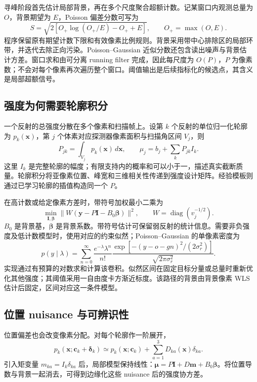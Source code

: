 \documentclass[UTF8,11pt,a4paper,fontset=fandol]{ctexart}
\newcommand{\diag}{\operatorname{diag}}
\begin{document}
寻峰阶段首先估计局部背景，再在多个尺度聚合超额计数。记某窗口内观测总量为 $O$，背景期望为 $E$，Poisson 偏差分数可写为
\begin{equation}
S=\sqrt{2\left[O_+\log(O_+/E)-O_++E\right]},
\qquad O_+=\max(O,E).
\end{equation}
程序保留原有期望计数下限和有效像素比例规则。背景采用带中心排除区的局部环带，并迭代去除正向污染。Poisson--Gaussian 近似分数还包含读出噪声与背景估计方差。窗口求和由可分离 running filter 完成，因此每尺度为 $O(P)$，$P$ 为像素数；不会对每个像素再次遍历整个窗口。阈值输出是后续指标化的候选点，其含义是局部超额信号。

\subsection{强度为何需要轮廓积分}
一个反射的总强度分散在多个像素和扫描帧上。设第 $k$ 个反射的单位归一化轮廓为 $p_k(\bm x)$，第 $j$ 个体素对应探测器像素面积与扫描角区间 $V_j$，则
\begin{equation}
P_{jk}=\int_{V_j}p_k(\bm x)\,d\bm x,\qquad
\mu_j=b_j+\sum_kP_{jk}I_k.
\end{equation}
这里 $I_k$ 是完整轮廓的幅度；有限支持内的概率和可以小于一，描述真实截断质量。轮廓积分将亚像素位置、峰宽和三维相关性传递到强度设计矩阵。经验模板则通过已学习轮廓的插值构造同一个 $P$。

在高计数或给定像素方差时，带符号加权最小二乘为
\begin{equation}
\min_{\bm I,\bm\beta}
\|W(\bm y-P\bm I-B_0\bm\beta)\|^2,
\qquad W=\diag(v_j^{-1/2}).
\end{equation}
$B_0$ 是背景基，$\bm\beta$ 是背景系数。带符号估计可保留弱反射的统计信息。需要非负强度及低计数模型时，使用对应的约束似然；Poisson--Gaussian 的单像素密度为
\begin{equation}
p(y\mid\lambda)=\sum_{n=0}^{\infty}
\frac{e^{-\lambda}\lambda^n}{n!}
\frac{\exp[-(y-o-gn)^2/(2\sigma_r^2)]}{\sqrt{2\pi\sigma_r^2}}.
\end{equation}
实现通过有预算的对数求和计算该卷积。似然区间在固定目标分量或总量时重新优化其他强度；其阈值采用一自由度卡方渐近标度。该路径的背景由背景像素 WLS 估计后固定，区间对应这一条件模型。

\subsection{位置 nuisance 与可辨识性}
位置偏差也会改变像素分配。对每个轮廓作一阶展开，
\begin{equation}
p_k(\bm x;\bm c_k+\bm\delta_k)
\simeq p_k(\bm x;\bm c_k)
+\sum_{a=1}^3D_{ka}(\bm x)\delta_{ka}.
\end{equation}
引入矩变量 $m_{ka}=I_k\delta_{ka}$ 后，局部模型保持线性：$\bm\mu=P\bm I+D\bm m+B_0\bm\beta$。将位置导数与背景一起消去，可得到边缘化这些 nuisance 后的强度协方差。
\end{document}
